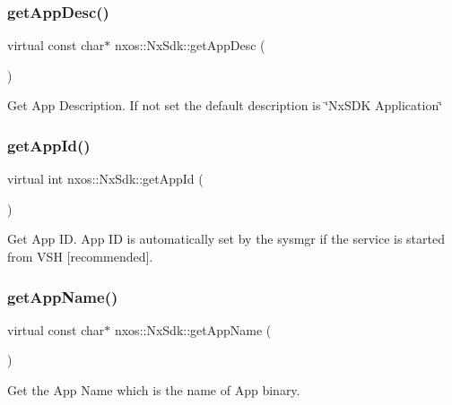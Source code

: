 \subsubsection{\texorpdfstring{get\+App\+Desc()}{getAppDesc()}}
{\footnotesize\ttfamily virtual const char$\ast$ nxos\+::\+Nx\+Sdk\+::get\+App\+Desc (\begin{DoxyParamCaption}{ }\end{DoxyParamCaption})\hspace{0.3cm}{\ttfamily [pure virtual]}}

Get App Description. If not set the default description is \char`\"{}\+Nx\+S\+D\+K Application\char`\"{} \mbox{\label{classnxos_1_1_nx_sdk_ac82af6d262439275f27c745082bf3fd7}} 
\subsubsection{\texorpdfstring{get\+App\+Id()}{getAppId()}}
{\footnotesize\ttfamily virtual int nxos\+::\+Nx\+Sdk\+::get\+App\+Id (\begin{DoxyParamCaption}{ }\end{DoxyParamCaption})\hspace{0.3cm}{\ttfamily [pure virtual]}}

Get App ID. App ID is automatically set by the sysmgr if the service is started from V\+SH \mbox{[}recommended\mbox{]}. \mbox{\label{classnxos_1_1_nx_sdk_a9ba7da2cd8cb4f82438135ee651efdb0}} 
\subsubsection{\texorpdfstring{get\+App\+Name()}{getAppName()}}
{\footnotesize\ttfamily virtual const char$\ast$ nxos\+::\+Nx\+Sdk\+::get\+App\+Name (\begin{DoxyParamCaption}{ }\end{DoxyParamCaption})\hspace{0.3cm}{\ttfamily [pure virtual]}}

Get the App Name which is the name of App binary. \mbox{\label{classnxos_1_1_nx_sdk_a98bcb70d1bf60e38b41eacdf0a72dc89}} 
